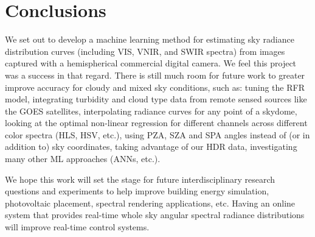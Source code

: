 \section{Conclusions}
\label{sec:conclusions}

We set out to develop a machine learning method for estimating sky radiance distribution curves (including VIS, VNIR, and SWIR spectra) from images captured with a hemispherical commercial digital camera. We feel this project was a success in that regard. There is still much room for future work to greater improve accuracy for cloudy and mixed sky conditions, such as: tuning the RFR model, integrating turbidity and cloud type data from remote sensed sources like the GOES satellites, interpolating radiance curves for any point of a skydome, looking at the optimal non-linear regression for different channels across different color spectra (HLS, HSV, etc.), using PZA, SZA and SPA angles instead of (or in addition to) sky coordinates, taking advantage of our HDR data, investigating many other ML approaches (ANNs, etc.).

We hope this work will set the stage for future interdisciplinary research questions and experiments to help improve building energy simulation, photovoltaic placement, spectral rendering applications, etc. Having an online system that provides real-time whole sky angular spectral radiance distributions will improve real-time control systems. 


